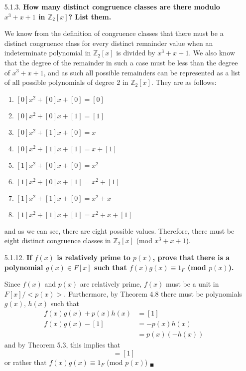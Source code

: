 \documentclass{article}
\begin{document}
\begin{enumerate}
		\item [5.1.3. ] \textbf{How many distinct congruence classes are there modulo $x^3 + x + 1$
			in $\mathbb{Z}_2[x]$? List them.}

			We know from the definition of congruence classes that there must be a distinct
			congruence class for every distinct remainder value when an indeterminate polynomial in
			$\mathbb{Z}_2[x]$ is divided by $x^3 + x + 1$. We also know that the degree of the 
			remainder in such a case must be less than the degree of $x^3 + x + 1$, and as such all
			possible remainders can be represented as a list of all possible polynomials of degree
			2 in $\mathbb{Z}_2[x]$. They are as follows:

			\begin{enumerate}
				\item $[0]x^2 + [0]x + [0] = [0]$
				\item $[0]x^2 + [0]x + [1] = [1]$
				\item $[0]x^2 + [1]x + [0] = x$
				\item $[0]x^2 + [1]x + [1] = x + [1]$
				\item $[1]x^2 + [0]x + [0] = x^2$
				\item $[1]x^2 + [0]x + [1] = x^2 + [1]$
				\item $[1]x^2 + [1]x + [0] = x^2 + x$
				\item $[1]x^2 + [1]x + [1] = x^2 + x + [1]$
			\end{enumerate}

			and as we can see, there are eight possible values. Therefore, there must be eight 
			distinct congruence classes in $\mathbb{Z}_2[x]$ (mod $x^3 + x + 1$).

		\item [5.1.12. ] \textbf{If $f(x)$ is relatively prime to $p(x)$, prove that there is a 
			polynomial $g(x) \in F[x]$ such that $f(x)g(x) \equiv 1_F$ (mod $p(x)$).}

			Since $f(x)$ and $p(x)$ are relatively prime, $f(x)$ must be a unit in $F[x]/<p(x)>$. 
			Furthermore, by Theorem 4.8 there must be polynomials $g(x)$, $h(x)$ such that
			\begin{align*}
				f(x)g(x) + p(x)h(x) & = [1] \\
				f(x)g(x) - [1] & = -p(x)h(x) \\
					& = p(x)(-h(x)) 
			\end{align*}
			and by Theorem 5.3, this implies that 
			\begin{equation*}
				[f(x)g(x)] = [1]
			\end{equation*}
			or rather that $f(x)g(x) \equiv 1_F$ (mod $p(x)$) $_{\blacksquare}$


\end{enumerate}
\end{document}

